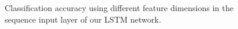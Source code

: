 \begin{figure}[h]
	\centering
	\caption{Classification accuracy using different feature dimensions in the sequence input layer of our LSTM network.}
	\label{fig:axis}
\end{figure}











%
